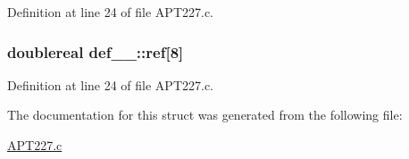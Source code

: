 Definition at line 24 of file A\+P\+T227.\+c.

\subsubsection[{\texorpdfstring{ref}{ref}}]{\setlength{\rightskip}{0pt plus 5cm}doublereal def\+\_\+\_\+\+::ref\mbox{[}8\mbox{]}}\hypertarget{structdef__1___aed1479e1155f74c5f056d22d3cf17d02}{}\label{structdef__1___aed1479e1155f74c5f056d22d3cf17d02}


Definition at line 24 of file A\+P\+T227.\+c.



The documentation for this struct was generated from the following file\+:\begin{DoxyCompactItemize}
\item 
\hyperlink{APT227_8c}{A\+P\+T227.\+c}\end{DoxyCompactItemize}
